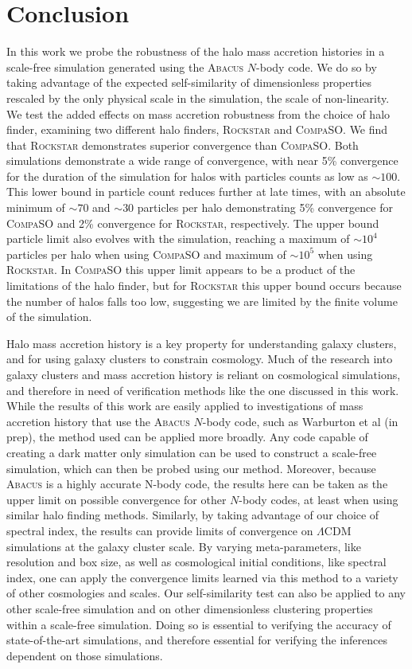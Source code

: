 \section{Conclusion}\label{ch3_conclusion}
In this work we probe the robustness of the halo mass accretion histories in a scale-free simulation generated using the \textsc{Abacus} $N$-body code. We do so by taking advantage of the expected self-similarity of dimensionless properties rescaled by the only physical scale in the simulation, the scale of non-linearity. We test the added effects on mass accretion robustness from the choice of halo finder, examining two different halo finders, \textsc{Rockstar} and \textsc{CompaSO}. We find that \textsc{Rockstar} demonstrates superior convergence than \textsc{CompaSO}. Both simulations demonstrate a wide range of convergence, with near 5\% convergence for the duration of the simulation for halos with particles counts as low as $\sim100$. This lower bound in particle count reduces further at late times, with an absolute minimum of $\sim70$ and $\sim30$ particles per halo demonstrating 5\% convergence for \textsc{CompaSO} and 2\% convergence for \textsc{Rockstar}, respectively. The upper bound particle limit also evolves with the simulation, reaching a maximum of $\sim10^4$ particles per halo when using \textsc{CompaSO} and maximum of $\sim10^5$ when using \textsc{Rockstar}. In \textsc{CompaSO} this upper limit appears to be a product of the limitations of the halo finder, but for \textsc{Rockstar} this upper bound occurs because the number of halos falls too low, suggesting we are limited by the finite volume of the simulation.

Halo mass accretion history is a key property for understanding galaxy clusters, and for using galaxy clusters to constrain cosmology. Much of the research into galaxy clusters and mass accretion history is reliant on cosmological simulations, and therefore in need of verification methods like the one discussed in this work. While the results of this work are easily applied to investigations of mass accretion history that use the \textsc{Abacus} $N$-body code, such as Warburton et al (in prep), the method used can be applied more broadly. Any code capable of creating a dark matter only simulation can be used to construct a scale-free simulation, which can then be probed using our method. Moreover, because \textsc{Abacus} is a highly accurate N-body code, the results here can be taken as the upper limit on possible convergence for other $N$-body codes, at least when using similar halo finding methods. Similarly, by taking advantage of our choice of spectral index, the results can provide limits of convergence on $\Lambda$CDM simulations at the galaxy cluster scale. By varying meta-parameters, like resolution and box size, as well as cosmological initial conditions, like spectral index, one can apply the convergence limits learned via this method to a variety of other cosmologies and scales. Our self-similarity test can also be applied to any other scale-free simulation and on other dimensionless clustering properties within a scale-free simulation. Doing so is essential to verifying the accuracy of state-of-the-art simulations, and therefore essential for verifying the inferences dependent on those simulations.


